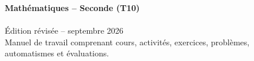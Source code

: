 \cleardoublepage
\thispagestyle{empty}
\vspace*{\fill}
\begin{center}
{\color{BN}\Large\bfseries Mathématiques -- Seconde (T10)}\\[1em]
{\large \MdgEditionLabel}\\[2em]
{\small Édition révisée -- septembre 2026}\\[1em]
{\small Manuel de travail comprenant cours, activités, exercices,
problèmes, automatismes et évaluations.}
\end{center}
\vspace*{\fill}
